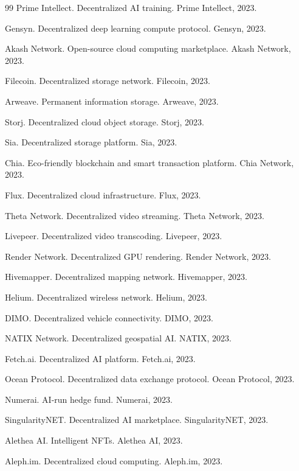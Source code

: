 \documentclass[12pt,a4paper]{ctexart}
\begin{document}
\begin{thebibliography}{99}
 Prime Intellect. Decentralized AI training. Prime Intellect, 2023.

 Gensyn. Decentralized deep learning compute protocol. Gensyn, 2023.

 Akash Network. Open-source cloud computing marketplace. Akash Network, 2023.

 Filecoin. Decentralized storage network. Filecoin, 2023.

 Arweave. Permanent information storage. Arweave, 2023.

 Storj. Decentralized cloud object storage. Storj, 2023.

 Sia. Decentralized storage platform. Sia, 2023.

 Chia. Eco-friendly blockchain and smart transaction platform. Chia Network, 2023.

 Flux. Decentralized cloud infrastructure. Flux, 2023.

 Theta Network. Decentralized video streaming. Theta Network, 2023.

 Livepeer. Decentralized video transcoding. Livepeer, 2023.

 Render Network. Decentralized GPU rendering. Render Network, 2023.

 Hivemapper. Decentralized mapping network. Hivemapper, 2023.

 Helium. Decentralized wireless network. Helium, 2023.

 DIMO. Decentralized vehicle connectivity. DIMO, 2023.

 NATIX Network. Decentralized geospatial AI. NATIX, 2023.

 Fetch.ai. Decentralized AI platform. Fetch.ai, 2023.

 Ocean Protocol. Decentralized data exchange protocol. Ocean Protocol, 2023.

 Numerai. AI-run hedge fund. Numerai, 2023.

 SingularityNET. Decentralized AI marketplace. SingularityNET, 2023.

 Alethea AI. Intelligent NFTs. Alethea AI, 2023.

 Aleph.im. Decentralized cloud computing. Aleph.im, 2023.


\end{thebibliography}
\end{document}
